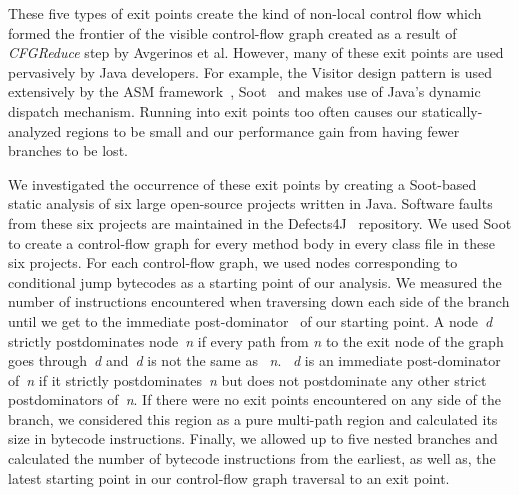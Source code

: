 These five types of exit points create the kind of non-local control flow which formed the frontier of the visible control-flow graph created as a result of \textit{CFGReduce} step by Avgerinos et al.
%
However, many of these exit points are used pervasively by Java developers.
%
For example, the Visitor design pattern is used extensively by the ASM framework~\cite{asm}, Soot~\cite{soot} and makes use of Java\rq s dynamic dispatch mechanism.
%
Running into exit points too often causes our statically-analyzed regions to be small and our performance gain from having fewer branches to be lost.

We investigated the occurrence of these exit points by creating a Soot-based static analysis of six large open-source projects written in Java.
%
Software faults from these six projects are maintained in the Defects4J~\cite{defects4j} repository.
%
We used Soot to create a control-flow graph for every method body in every class file in these six projects.
%
For each control-flow graph, we used nodes corresponding to conditional jump bytecodes as a starting point of our analysis.
%
We measured the number of instructions encountered when traversing down
each side of the branch until we get to the immediate post-dominator~\cite{dragon-book} of our starting point.
%
A node~\textit{d} strictly postdominates node~\textit{n} if every path from
\textit{n} to the exit node of the graph goes through~\textit{d}
and~\textit{d} is not the same as ~\textit{n}.
%
~\textit{d} is an immediate post-dominator of~\textit{n} if
it strictly postdominates~\textit{n} but does not postdominate any other
strict postdominators of~\textit{n}.
%
If there were no exit points encountered on any side of the branch, we considered this region as a pure multi-path region and calculated its size in bytecode instructions.
%
Finally, we allowed up to five nested branches and calculated the number of bytecode instructions from the earliest, as well as, the latest starting point in our control-flow graph traversal to an exit point.

